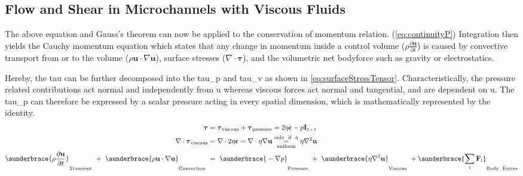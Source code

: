 \subsection{Flow and Shear in Microchannels with Viscous Fluids}
\label{sec:theo:flow_and_Shear}

The above equation and Gauss's theorem can now be applied to the conservation of momentum relation. (\cref{eq:continuityP}) Integration then yields the Cauchy momentum equation which states that any change in momentum inside a control volume ($\rho \frac{\partial \mathbf{u}}{\partial t}$) is caused by convective transport from or to the volume ($\rho\mathbf{u} \cdot \nabla \mathbf{u}$), surface stresses ($ \nabla \cdot \boldsymbol{\tau}$), and the volumetric net \gls{bodyforce} such as gravity or electrostatics.

Hereby, the \gls{tau} can be further decomposed into the \gls{tau_p} and \gls{tau_v} as shown in \cref{eq:surfaceStressTensor}. Characteristically, the pressure related contributions act normal and independently from \gls{u} whereas viscous forces act normal and tangential, and are dependent on \gls{u}. The \gls{tau_p} can therefore be expressed by a scalar pressure acting in every spatial dimension, which is mathematically represented by the identity. 
\begin{align}
	\boldsymbol{\tau} &= \boldsymbol{\tau}_\text{viscous} +  \boldsymbol{\tau}_\text{pressure} = 2\eta \boldsymbol{\epsilon} - p \mathbf{I}_\text{\scaleto{3 \times 3}{4pt}} \label{eq:surfaceStressTensor}\\
	\nabla \cdot \boldsymbol{\tau}_\text{viscous} &= \nabla \cdot 2\eta \boldsymbol{\epsilon} = \nabla \cdot \eta \nabla \mathbf{u} \underset{\text{uniform}}{\overset{\text{only \ if \ }\eta}{=}} \eta \nabla^2 \mathbf{u} 	\label{eq:divergence_Stresstensor} \\
	\aunderbrace{\vphantom{\sum_{i}} \rho \frac{\partial \mathbf{u}}{\partial t}}_{\text{Transient}}\ +\ \aunderbrace{\vphantom{\sum_{i}}\rho\mathbf{u} \cdot \nabla \mathbf{u}}_{\text{Convection}}\ &=\ \aunderbrace{\vphantom{\sum_{i}}-\nabla p}_{\text{Pressure}}\ +\ \aunderbrace{\vphantom{\sum_{i}}\eta \nabla^2 \mathbf{u}}_{\text{Viscous}}\ + \aunderbrace{\sum_{i}\mathbf{F}_\text{i}}_{\text{Body \ Forces}} \label{eq:navierstokes}
\end{align}

